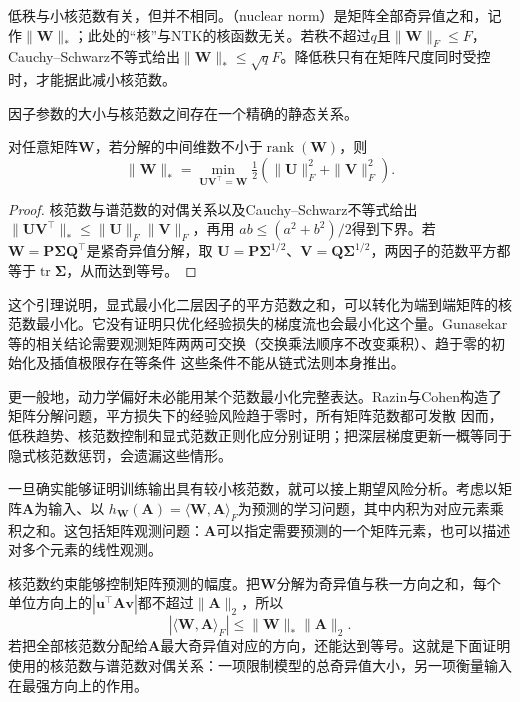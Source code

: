 低秩与小核范数有关，但并不相同。（nuclear norm）是矩阵全部奇异值之和，记作$\|\bm W\|_*$；此处的“核”与NTK的核函数无关。若秩不超过$q$且$\|\bm W\|_F\leq F$，Cauchy--Schwarz不等式给出$\|\bm W\|_*\leq\sqrt qF$。降低秩只有在矩阵尺度同时受控时，才能据此减小核范数。

因子参数的大小与核范数之间存在一个精确的静态关系。
\begin{lemma}[二层分解的范数关系]
\label{lem:factorization-nuclear-norm}
对任意矩阵$\bm W$，若分解的中间维数不小于$\operatorname{rank}(\bm W)$，则
\[
 \|\bm W\|_*=\min_{\bm U\bm V^\top=\bm W}
       \tfrac12(\|\bm U\|_F^2+\|\bm V\|_F^2).
\]
\end{lemma}
\begin{proof}
核范数与谱范数的对偶关系以及Cauchy--Schwarz不等式给出
$\|\bm U\bm V^\top\|_*\leq\|\bm U\|_F\|\bm V\|_F$，再用
$ab\leq(a^2+b^2)/2$得到下界。若$\bm W=\bm P\bm\Sigma\bm Q^\top$是紧奇异值分解，取
$\bm U=\bm P\bm\Sigma^{1/2}$、$\bm V=\bm Q\bm\Sigma^{1/2}$，两因子的范数平方都等于$\operatorname{tr}\bm\Sigma$，从而达到等号。
\end{proof}

这个引理说明，显式最小化二层因子的平方范数之和，可以转化为端到端矩阵的核范数最小化。它没有证明只优化经验损失的梯度流也会最小化这个量。Gunasekar等的相关结论需要观测矩阵两两可交换（交换乘法顺序不改变乘积）、趋于零的初始化及插值极限存在等条件 这些条件不能从链式法则本身推出。

更一般地，动力学偏好未必能用某个范数最小化完整表达。Razin与Cohen构造了矩阵分解问题，平方损失下的经验风险趋于零时，所有矩阵范数都可发散 因而，低秩趋势、核范数控制和显式范数正则化应分别证明；把深层梯度更新一概等同于隐式核范数惩罚，会遗漏这些情形。

一旦确实能够证明训练输出具有较小核范数，就可以接上期望风险分析。考虑以矩阵$\bm A$为输入、以
$h_{\bm W}(\bm A)=\langle\bm W,\bm A\rangle_F$为预测的学习问题，其中内积为对应元素乘积之和。这包括矩阵观测问题：$\bm A$可以指定需要预测的一个矩阵元素，也可以描述对多个元素的线性观测。

核范数约束能够控制矩阵预测的幅度。把$\bm W$分解为奇异值与秩一方向之和，每个单位方向上的$|\bm u^\top\bm A\bm v|$都不超过$\|\bm A\|_2$，所以
\[
 |\langle\bm W,\bm A\rangle_F|\leq\|\bm W\|_*\|\bm A\|_2.
\]
若把全部核范数分配给$\bm A$最大奇异值对应的方向，还能达到等号。这就是下面证明使用的核范数与谱范数对偶关系：一项限制模型的总奇异值大小，另一项衡量输入在最强方向上的作用。


